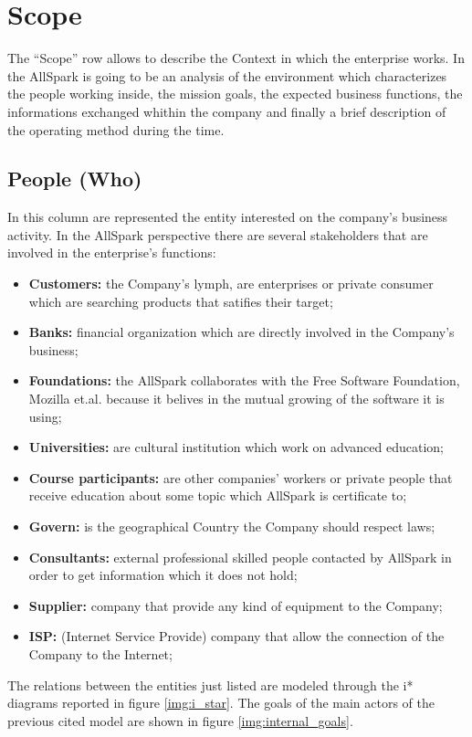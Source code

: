 \section{Scope}
\label{sec:Scope}
The ``Scope'' row allows to describe the Context in which the enterprise works. In the AllSpark is going to be an analysis of the environment which characterizes the people working inside, the mission goals, the expected business functions, the informations exchanged whithin the company and finally a brief description of the operating method during the time.

\subsection{People (Who)}
\label{subsec:scope[People]}
In this column are represented the entity interested on the company's business activity. In the AllSpark perspective there are several stakeholders that are involved in the enterprise's functions:
\begin{itemize}
 \item {\bf Customers:} the Company's lymph, are enterprises or private consumer which are searching products that satifies their target;
 \item {\bf Banks:} financial organization which are directly involved in the Company's business;
 \item {\bf Foundations:} the AllSpark collaborates with the Free Software Foundation, Mozilla et.al. because it belives in the mutual growing of the software it is using;
 \item {\bf Universities:} are cultural institution which work on advanced education;
 \item {\bf Course participants:} are other companies' workers or private people that receive education about some topic which AllSpark is certificate to;
 \item {\bf Govern:} is the geographical Country the Company should respect laws;
 \item {\bf Consultants:} external professional skilled people contacted by AllSpark in order to get information which it does not hold;
 \item {\bf Supplier:} company that provide any kind of equipment to the Company;
 \item {\bf ISP:} (Internet Service Provide) company that allow the connection of the Company to the Internet;
\end{itemize}

The relations between the entities just listed are modeled through the i* diagrams reported in figure \ref{img:i_star}. The goals of the main actors of the previous cited model are shown in figure \ref{img:internal_goals}.



